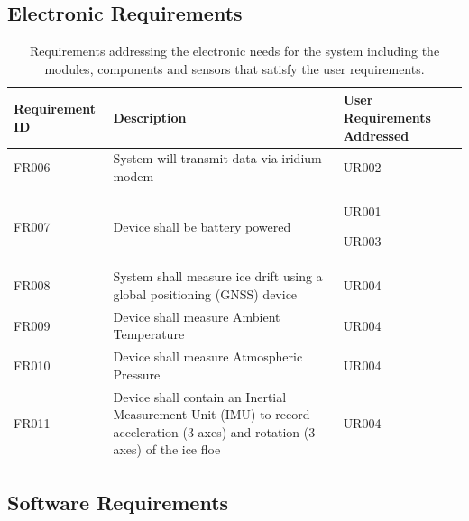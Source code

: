 \subsection{Electronic Requirements}

\begin{table}[H]
    \centering
    \caption{Requirements addressing the electronic needs for the system including the modules, components and sensors that satisfy the user requirements.}
    \begin{tabular}{|>{\centering}m{}|>{\RaggedRight}m{}| >{\RaggedRight}m{} |}
    \hline
         Requirement ID & Description & User Requirements Addressed\\
         \hline
         FR006 & System will transmit data via iridium modem & UR002\\
         \hline
         FR007 & Device shall be battery powered & UR001\par UR003\\
         \hline
          FR008 & System shall measure ice drift using a  global positioning (GNSS) device & UR004\\
         \hline
         FR009 & Device shall measure Ambient Temperature & UR004\\
         \hline
         FR010 & Device shall measure Atmospheric Pressure & UR004 \\
         \hline
         FR011 & Device shall contain an Inertial Measurement Unit (IMU) to record acceleration (3-axes) and rotation (3-axes) of the ice floe & UR004 \\
         \hline
    \end{tabular}
    \label{tab:other_funcreqs}
\end{table}

\subsection{Software Requirements}

